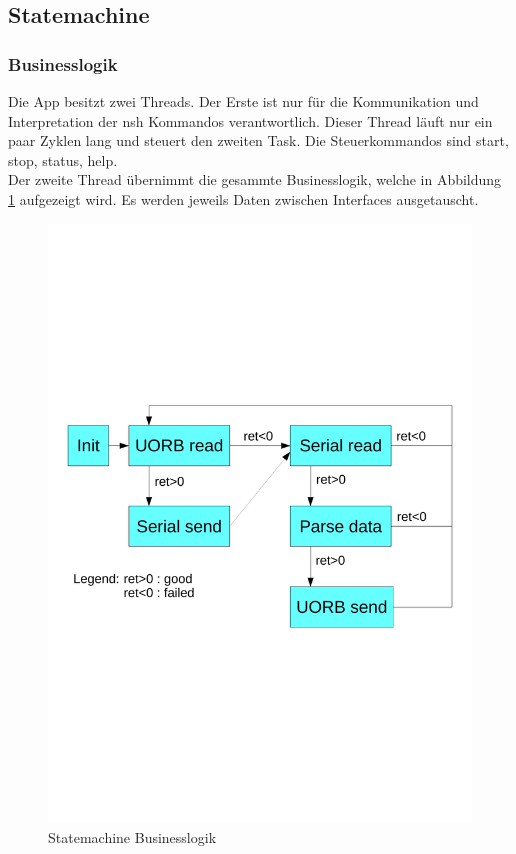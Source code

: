 \subsection{Statemachine}
\subsubsection{Businesslogik}
Die App besitzt zwei Threads. Der Erste ist nur für die Kommunikation und Interpretation der nsh Kommandos verantwortlich. Dieser Thread läuft nur ein paar Zyklen lang und steuert den zweiten Task. Die Steuerkommandos sind start, stop, status, help.\\

\noindent Der zweite Thread übernimmt die gesammte Businesslogik, welche in Abbildung \ref{fig:Statemachine Businesslogik} aufgezeigt wird. Es werden jeweils Daten zwischen Interfaces ausgetauscht.\\

\begin{figure}[ht]
  \begin{center}
  \includegraphics[scale=0.5, trim={1cm 9.5cm 1cm 9cm},clip]{pic/50_app/statemachine_thread.pdf}
  \caption{Statemachine Businesslogik}
  \label{fig:Statemachine Businesslogik}
  \end{center}
\end{figure}

